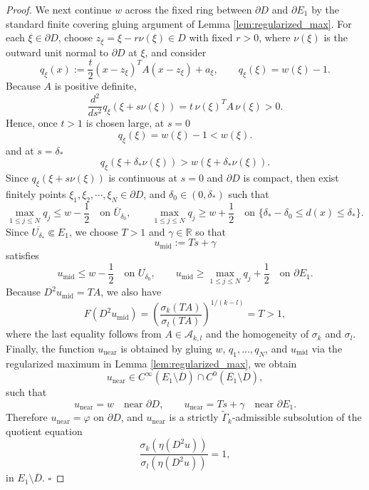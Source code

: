 \documentclass[reqno,a4paper]{amsart}
\numberwithin{equation}{section}
\begin{document}
\begin{proof}
		We next continue $w$ across the fixed ring between $\partial D$ and $\partial E_1$ by the standard finite covering gluing argument of Lemma \ref{lem:regularized_max}. For each $\xi \in \partial D$, choose $z_\xi = \xi - r\nu(\xi) \in D$ with fixed $r > 0$, where $\nu(\xi)$ is the outward unit normal to $\partial D$ at $\xi$, and consider
		\begin{equation}
			q_\xi(x) := \frac{t}{2} \left( x - z_\xi \right)^T A \left( x - z_\xi \right) + a_\xi, \qquad q_\xi(\xi) = w(\xi) - 1.
		\end{equation}
		Because $A$ is positive definite, 
		\[
		\frac{d^2}{ds^2} q_\xi(\xi+s\nu(\xi))
		=
		t\,\nu(\xi)^T A\,\nu(\xi) > 0.
		\] Hence, once $t > 1$ is chosen large, at $s=0$
		\[
		q_\xi(\xi) = w(\xi) - 1 < w(\xi).
		\] and at  $s=\delta_*$
		\[
		q_\xi(\xi + \delta_* \nu(\xi)) > w(\xi + \delta_* \nu(\xi)). 
		\] 
		Since  $q_\xi(\xi+s\nu(\xi))$ is continuous at $s=0$ and $\partial D$ is compact, then exist finitely  points $\xi_1,\xi_2, \cdots, \xi_N \in \partial D $, and $ \delta_0 \in(0,\delta_*)$ such that 
		\[
		\max_{1 \leq j \leq N} q_j \leq w - \frac{1}{2} \quad \text{on } \overline{U}_{\delta_0}, \qquad
		\max_{1 \leq j \leq N} q_j \geq w + \frac{1}{2} \quad \text{on } \{ \delta_* - \delta_0 \le d(x) \le \delta_* \}.
		\]
		Since $\overline{U_{\delta_*}} \Subset E_1$, we choose $T > 1$ and $\gamma \in \mathbb{R}$ so that
		\[
		u_{\mathrm{mid}} := Ts + \gamma
		\]
		satisfies
		\[
		u_{\mathrm{mid}} \le w - \frac{1}{2} \quad \text{on } \overline{U_{\delta_0}}, \qquad
		u_{\mathrm{mid}} \ge \max_{1 \le j \le N} q_j + \frac{1}{2} \quad \text{on } \partial E_1.
		\]
		Because $D^2 u_{\mathrm{mid}} = T A$, we also have
		\begin{equation}
			F(D^2 u_{\mathrm{mid}}) = \left( \frac{\sigma_k(TA)}{\sigma_l(TA)} \right)^{1/(k-l)}
			= T > 1,
		\end{equation}
		where the last equality follows from $A \in \mathcal{A}_{k,l}$ and the homogeneity of $\sigma_k$ and $\sigma_l$. 
		Finally, the function $u_{\mathrm{near}}$ is obtained by gluing $w$, $q_1,\dots,q_N$, and $u_{\mathrm{mid}}$ via the regularized maximum in Lemma \ref{lem:regularized_max}, we obtain
		\begin{equation}
			u_{\mathrm{near}} \in C^\infty(E_1 \setminus \overline{D}) \cap C^0(\overline{E_1} \setminus D),
		\end{equation}
		such that
		\[
		u_{\mathrm{near}} = w \quad \text{near } \partial D, \qquad
		u_{\mathrm{near}} = Ts + \gamma \quad \text{near } \partial E_1.
		\]
		Therefore $u_{\mathrm{near}} = \varphi$ on $\partial D$, and $u_{\mathrm{near}}$ is a strictly $\widetilde{\Gamma}_k$-admissible subsolution of the quotient equation
		\[
		\frac{\sigma_k(\eta(D^2 u))}{\sigma_l(\eta(D^2 u))} = 1,
		\]
		in $E_1 \setminus \overline{D}$. $\square$
	\end{proof}
	
\end{document}
